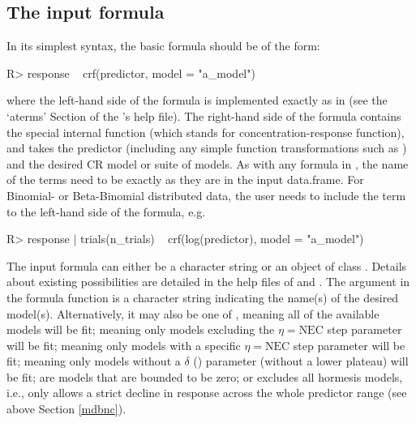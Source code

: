 \documentclass[
  shortnames]{jss}
\begin{document}
\hypertarget{the-input-formula}{%
\subsection{The input formula}\label{the-input-formula}}

In its simplest syntax, the basic  formula should be of the form:

\begin{CodeChunk}
\begin{CodeInput}
R> response ~ crf(predictor, model = "a_model")
\end{CodeInput}
\end{CodeChunk}

where the left-hand side of the formula is implemented exactly as in  (see the `aterms' Section of the 's help file). The right-hand side of the formula contains the special internal function  (which stands for concentration-response function), and takes the predictor (including any simple function transformations such as ) and the desired CR model or suite of models. As with any formula in , the name of the terms need to be exactly as they are in the input data.frame. For Binomial- or Beta-Binomial distributed data, the user needs to include the  term to the left-hand side of the formula, e.g.

\begin{CodeChunk}
\begin{CodeInput}
R> response | trials(n_trials) ~ crf(log(predictor), model = "a_model")
\end{CodeInput}
\end{CodeChunk}

The input formula can either be a character string or an object of class . Details about existing possibilities are detailed in the help files of  and . The argument  in the formula function  is a character string indicating the name(s) of the desired model(s). Alternatively, it may also be one of , meaning all of the available models will be fit;  meaning only models excluding the \(\eta = \text{NEC}\) step parameter will be fit;  meaning only models with a specific \(\eta = \text{NEC}\) step parameter will be fit;  meaning only models without a \(\delta\) () parameter (without a lower plateau) will be fit;  are models that are bounded to be zero; or  excludes all hormesis models, i.e., only allows a strict decline in response across the whole predictor range (see above Section \ref{mdbnc}).
\end{document}
